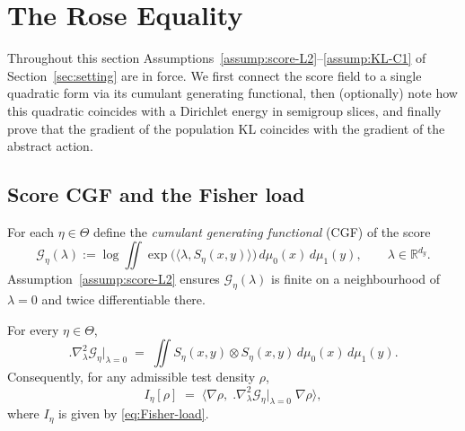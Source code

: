 


\section{The Rose Equality}
\label{sec:rose-equality}

Throughout this section Assumptions~\ref{assump:score-L2}--\ref{assump:KL-C1} of Section~\ref{sec:setting} are in force. 
We first connect the score field to a single quadratic form via its cumulant generating functional, then (optionally) note how this quadratic coincides with a Dirichlet energy in semigroup slices, and finally prove that the gradient of the population KL coincides with the gradient of the abstract action.

\subsection{Score CGF and the Fisher load}
\label{subsec:CGF-Fisher}

For each $\eta\in\Theta$ define the \emph{cumulant generating functional} (CGF) of the score
\begin{equation}
    \mathcal G_\eta(\lambda)
      := \log \iint \exp\!\big(\langle \lambda, S_\eta(x,y)\rangle\big)\,
           d\mu_0(x)\,d\mu_1(y),
    \qquad \lambda\in\mathbb R^{d_y}.
    \label{eq:CGF}
\end{equation}
Assumption~\ref{assump:score-L2} ensures $\mathcal G_\eta(\lambda)$ is finite on a neighbourhood of $\lambda=0$ and twice differentiable there.

\begin{lemma}
\label{lem:hessian}
For every $\eta\in\Theta$,
\[
    \big.\nabla^2_{\lambda}\mathcal G_\eta\big|_{\lambda=0}
    \;=\;
    \iint S_\eta(x,y)\otimes S_\eta(x,y)\,
         d\mu_0(x)\,d\mu_1(y).
\]
Consequently, for any admissible test density $\rho$,
\[
    I_\eta[\rho]
    \;=\;
    \big\langle \nabla\rho,\;
               \big.\nabla^2_{\lambda}\mathcal G_\eta\big|_{\lambda=0}\;
               \nabla\rho \big\rangle,
\]
where $I_\eta$ is given by \eqref{eq:Fisher-load}.
\end{lemma}

